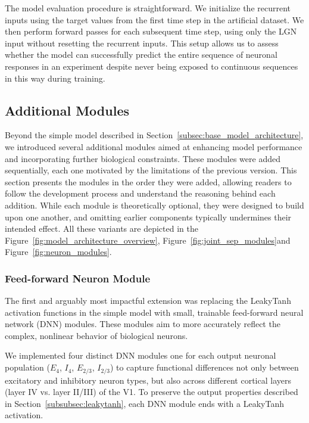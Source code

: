 The model evaluation procedure is straightforward. We initialize the recurrent inputs using the target values from the first time step in the artificial dataset. We then perform forward passes for each subsequent time step, using only the LGN input without resetting the recurrent inputs. This setup allows us to assess whether the model can successfully predict the entire sequence of neuronal responses in an experiment despite never being exposed to continuous sequences in this way during training.

\subsection{Additional Modules}
\label{subsec:additional_modules}

Beyond the simple model described in Section~\ref{subsec:base_model_architecture}, we introduced several additional modules aimed at enhancing model performance and incorporating further biological constraints. These modules were added sequentially, each one motivated by the limitations of the previous version. This section presents the modules in the order they were added, allowing readers to follow the development process and understand the reasoning behind each addition. While each module is theoretically optional, they were designed to build upon one another, and omitting earlier components typically undermines their intended effect. All these variants are depicted in the Figure~\ref{fig:model_architecture_overview}, Figure~\ref{fig:joint_sep_modules}and Figure~\ref{fig:neuron_modules}.

\subsubsection{Feed-forward Neuron Module}
\label{subsubsec:dnn_neuron}

The first and arguably most impactful extension was replacing the LeakyTanh activation functions in the simple model with small, trainable feed-forward neural network (DNN) modules. These modules aim to more accurately reflect the complex, nonlinear behavior of biological neurons.

We implemented four distinct DNN modules one for each output neuronal population ($E_4$, $I_4$, $E_{2/3}$, $I_{2/3}$) to capture functional differences not only between excitatory and inhibitory neuron types, but also across different cortical layers (layer IV vs. layer II/III) of the V1. To preserve the output properties described in Section~\ref{subsubsec:leakytanh}, each DNN module ends with a LeakyTanh activation.


